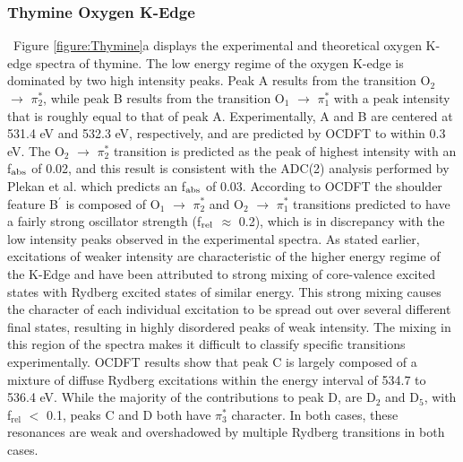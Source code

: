 \documentclass[12pt]{article}
\begin{document}
\subsubsection{Thymine Oxygen K-Edge}
\ Figure \ref{figure:Thymine}a displays the experimental and theoretical oxygen K-edge spectra of thymine. The low energy regime of the oxygen K-edge is dominated by two high intensity peaks. Peak A results from the transition O$_2$ $\rightarrow$ $\pi^*_2$, while peak B results from the transition O$_1$ $\rightarrow$ $\pi^*_1$ with a peak intensity that is roughly equal to that of peak A. Experimentally, A and B are centered at 531.4 eV and 532.3 eV, respectively, and are predicted by OCDFT to within 0.3 eV. The  O$_2$ $\rightarrow$ $\pi_2^*$ transition is predicted as the peak of highest intensity with an f$_{\rm abs}$ of 0.02, and this result is consistent with the ADC(2) analysis performed by Plekan et al. \cite{plekan_theoretical_2008} which predicts an f$_{\rm abs}$ of 0.03. According to OCDFT the shoulder feature B$^{\prime}$ is composed of O$_1$ $\rightarrow$ $\pi^*_2$ and O$_2$ $\rightarrow$ $\pi^*_1$ transitions predicted to have a fairly strong oscillator strength (f$_{\rm rel}$ $\approx$ 0.2), which is in discrepancy with the low intensity peaks observed in the experimental spectra.  As stated earlier, excitations of weaker intensity are characteristic of the higher energy regime of the K-Edge and have been attributed to strong mixing of core-valence excited states with Rydberg excited states of similar energy.\cite{robin_rydberg_1975} This strong mixing causes the character of each individual excitation to be spread out over several different final states, resulting in highly disordered peaks of weak intensity. The mixing in this region of the spectra makes it difficult to classify specific transitions experimentally. OCDFT results show that peak C is largely composed of a mixture of diffuse Rydberg excitations within the energy interval of 534.7 to 536.4 eV. While the majority of the contributions to peak D, are D$_2$ and D$_5$, with f$_{\text{rel}}$ $<$ 0.1, peaks C and D both have $\pi^*_3$ character. In both cases, these resonances are weak and overshadowed by multiple Rydberg transitions in both cases. 
\end{document}
